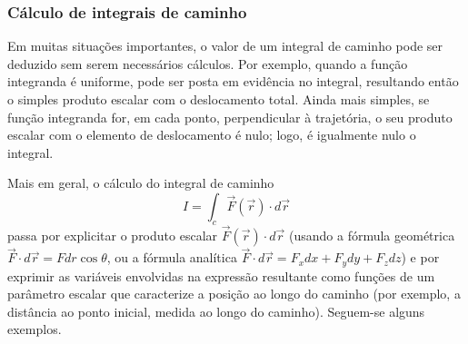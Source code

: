 \subsubsection*{Cálculo de integrais de caminho}
Em muitas situações importantes, o valor de um integral de caminho pode ser
deduzido sem serem necessários cálculos. Por exemplo, quando a função integranda
é uniforme, pode ser posta em evidência no integral, resultando então o simples
produto escalar com o deslocamento total. Ainda mais simples, se função
integranda for, em cada ponto, perpendicular à trajetória, o seu produto
escalar com o elemento de deslocamento é nulo; logo, é igualmente nulo o integral.

Mais em geral, o cálculo do integral de caminho
\begin{equation*}
I=\int_c\vec F(\vec r)\cdot d\vec r
\end{equation*}
passa por explicitar o produto escalar $\vec F(\vec r)\cdot d\vec r$ (usando a
fórmula geométrica $\vec F\cdot d\vec r=F dr\cos\theta$, ou a fórmula analítica
$\vec F\cdot d\vec r=F_xdx+F_ydy+F_zdz$) e por exprimir as variáveis envolvidas
na expressão resultante como funções de um parâmetro escalar que caracterize a
posição ao longo do caminho (por exemplo, a distância ao ponto inicial, medida
ao longo do caminho). Seguem-se alguns exemplos.

